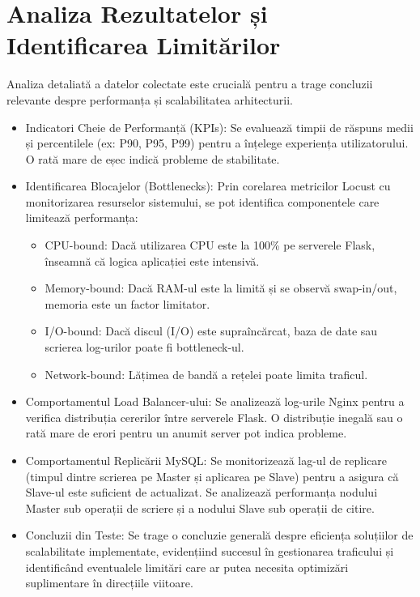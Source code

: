 \documentclass[12pt, a4paper, oneside, romanian]{teza-upb}
\begin{document}
\section{Analiza Rezultatelor și Identificarea Limitărilor}
Analiza detaliată a datelor colectate este crucială pentru a trage concluzii relevante despre performanța și scalabilitatea arhitecturii.
\begin{itemize}
	\item Indicatori Cheie de Performanță (KPIs): Se evaluează timpii de răspuns medii și percentilele (ex: P90, P95, P99) pentru a înțelege experiența utilizatorului. O rată mare de eșec indică probleme de stabilitate.
	
	\item Identificarea Blocajelor (Bottlenecks): Prin corelarea metricilor Locust cu monitorizarea resurselor sistemului, se pot identifica componentele care limitează performanța:
	\begin{itemize}
		\item CPU-bound: Dacă utilizarea CPU este la 100\% pe serverele Flask, înseamnă că logica aplicației este intensivă.
		
		\item Memory-bound: Dacă RAM-ul este la limită și se observă swap-in/out, memoria este un factor limitator.
		
		\item I/O-bound: Dacă discul (I/O) este supraîncărcat, baza de date sau scrierea log-urilor poate fi bottleneck-ul.
		
		\item Network-bound: Lățimea de bandă a rețelei poate limita traficul.

	\end{itemize}
	
	\item Comportamentul Load Balancer-ului: Se analizează log-urile Nginx pentru a verifica distribuția cererilor între serverele Flask. O distribuție inegală sau o rată mare de erori pentru un anumit server pot indica probleme.
	
	\item Comportamentul Replicării MySQL: Se monitorizează lag-ul de replicare (timpul dintre scrierea pe Master și aplicarea pe Slave) pentru a asigura că Slave-ul este suficient de actualizat. Se analizează performanța nodului Master sub operații de scriere și a nodului Slave sub operații de citire.
	\item Concluzii din Teste: Se trage o concluzie generală despre eficiența soluțiilor de scalabilitate implementate, evidențiind succesul în gestionarea traficului și identificând eventualele limitări care ar putea necesita optimizări suplimentare în direcțiile viitoare.
\end{itemize}
\end{document}
